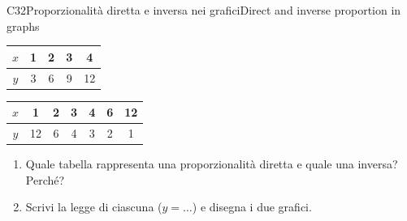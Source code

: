 \begin{esercizio}{C3}{2}{Proporzionalità diretta e inversa nei grafici}{Direct and inverse proportion in graphs}
\begin{center}
\small
\begin{tabular}{c|cccc}
$x$ & 1 & 2 & 3 & 4\\ \hline
$y$ & 3 & 6 & 9 & 12
\end{tabular}
\qquad\qquad
\begin{tabular}{c|cccccc}
$x$ & 1 & 2 & 3 & 4 & 6 & 12\\ \hline
$y$ & 12 & 6 & 4 & 3 & 2 & 1
\end{tabular}
\end{center}
\begin{enumerate}
\item Quale tabella rappresenta una proporzionalità diretta e quale una inversa? Perché?
\item Scrivi la legge di ciascuna ($y=\dots$) e disegna i due grafici.
\end{enumerate}
\end{esercizio}
